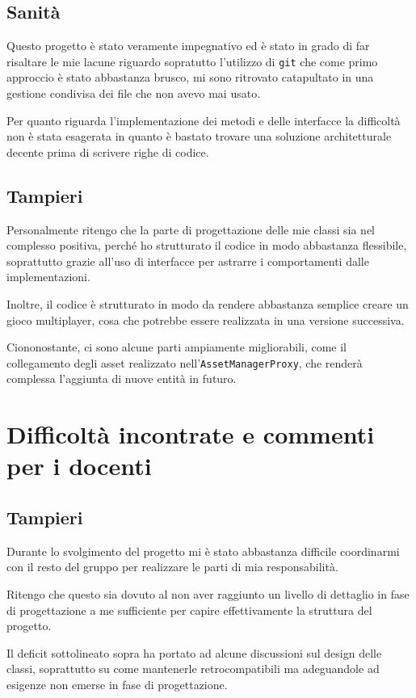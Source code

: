 \documentclass[a4paper,12pt]{report}
\begin{document}
    \subsection{Sanità}
    \par Questo progetto è stato veramente impegnativo ed è stato in grado di far risaltare le mie lacune riguardo sopratutto l'utilizzo di \texttt{git} che come
    primo approccio è stato abbastanza brusco, mi sono ritrovato catapultato in una gestione condivisa dei file che non avevo mai usato.
    \par Per quanto riguarda l'implementazione dei metodi e delle interfacce la difficoltà non è stata esagerata in quanto è bastato trovare una soluzione
    architetturale decente prima di scrivere righe di codice.
    \subsection{Tampieri}
    \par Personalmente ritengo che la parte di progettazione delle mie classi sia nel complesso positiva, perché
    ho strutturato il codice in modo abbastanza flessibile, soprattutto grazie all'uso di interfacce per astrarre
    i comportamenti dalle implementazioni.
    \par Inoltre, il codice è strutturato in modo da rendere abbastanza semplice creare un gioco multiplayer, cosa
    che potrebbe essere realizzata in una versione successiva.
    \par Ciononostante, ci sono alcune parti ampiamente migliorabili, come il collegamento degli asset realizzato
    nell'\texttt{AssetManagerProxy}, che renderà complessa l'aggiunta di nuove entità in futuro.
    \section{Difficoltà incontrate e commenti per i docenti}
    \subsection{Tampieri}
    \par Durante lo svolgimento del progetto mi è stato abbastanza difficile coordinarmi con il resto del gruppo per
    realizzare le parti di mia responsabilità.
    \par Ritengo che questo sia dovuto al non aver raggiunto un livello di dettaglio in fase di progettazione a me
    sufficiente per capire effettivamente la struttura del progetto.
    \par Il deficit sottolineato sopra ha portato ad alcune discussioni sul design delle classi, soprattutto su come
    mantenerle retrocompatibili ma adeguandole ad esigenze non emerse in fase di progettazione.
    \appendix
\end{document}
